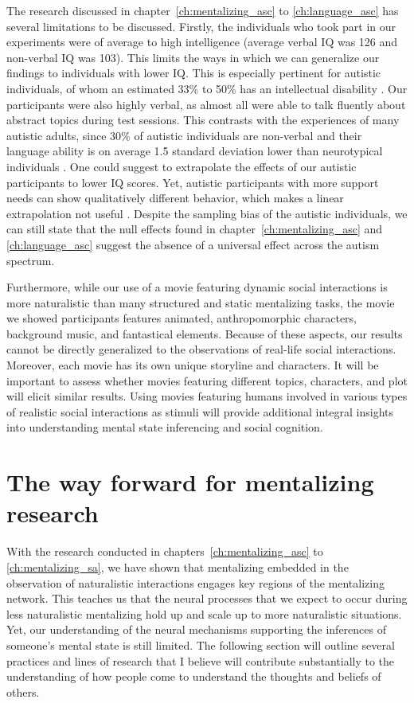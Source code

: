 The research discussed in chapter~\ref{ch:mentalizing_asc} to \ref{ch:language_asc} has several limitations to be discussed. Firstly, the individuals who took part in our experiments were of average to high intelligence (average verbal IQ was 126 and non-verbal IQ was 103). This limits the ways in which we can generalize our findings to individuals with lower IQ. This is especially pertinent for autistic individuals, of whom an estimated 33\% to 50\% has an intellectual disability \citep{katusic2021,shenouda2023}. Our participants were also highly verbal, as almost all were able to talk fluently about abstract topics during test sessions. This contrasts with the experiences of many autistic adults, since 30\% of autistic individuals are non-verbal and their language ability is on average 1.5 standard deviation lower than neurotypical individuals \citep{kwok2015,anderson2007}. One could suggest to extrapolate the effects of our autistic participants to lower IQ scores. Yet, autistic participants with more support needs can show qualitatively different behavior, which makes a linear extrapolation not useful \citep{wenar1986}. Despite the sampling bias of the autistic individuals, we can still state that the null effects found in chapter~\ref{ch:mentalizing_asc} and \ref{ch:language_asc} suggest the absence of a universal effect across the autism spectrum.

Furthermore, while our use of a movie featuring dynamic social interactions is more naturalistic than many structured and static mentalizing tasks, the movie we showed participants features animated, anthropomorphic characters, background music, and fantastical elements. Because of these aspects, our results cannot be directly generalized to the observations of real-life social interactions. Moreover, each movie has its own unique storyline and characters. It will be important to assess whether movies featuring different topics, characters, and plot will elicit similar results. Using movies featuring humans involved in various types of realistic social interactions as stimuli will provide additional integral insights into understanding mental state inferencing and social cognition.

\section{The way forward for mentalizing research}

With the research conducted in chapters~\ref{ch:mentalizing_asc} to \ref{ch:mentalizing_sa}, we have shown that mentalizing embedded in the observation of naturalistic interactions engages key regions of the mentalizing network. This teaches us that the neural processes that we expect to occur during less naturalistic mentalizing hold up and scale up to more naturalistic situations. Yet, our understanding of the neural mechanisms supporting the inferences of someone's mental state is still limited. The following section will outline several practices and lines of research that I believe will contribute substantially to the understanding of how people come to understand the thoughts and beliefs of others.

